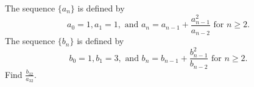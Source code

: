The sequence $ \{a_n\}$ is defined by
\[ a_0 = 1,a_1 = 1, \text{ and } a_n = a_{n - 1} + \frac {a_{n - 1}^2}{a_{n - 2}}\text{ for }n\ge2.
\]The sequence $ \{b_n\}$ is defined by
\[ b_0 = 1,b_1 = 3, \text{ and } b_n = b_{n - 1} + \frac {b_{n - 1}^2}{b_{n - 2}}\text{ for }n\ge2.
\]Find $ \frac {b_{32}}{a_{32}}$.